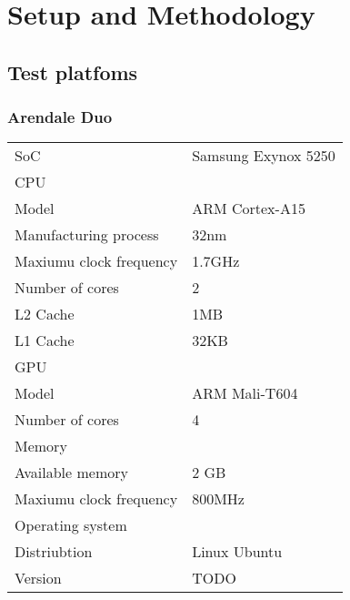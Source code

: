 \chapter[Setup and Methodology]{Setup and Methodology}

\section{Test platfoms}

\subsection{Arendale Duo}
\begin{table}[h]
  \begin{tabular}{ll}
    SoC & Samsung Exynox 5250 \\
    CPU &  \\
    Model & ARM Cortex-A15 \\
    Manufacturing process & 32nm \\
    Maxiumu clock frequency & 1.7GHz \\
    Number of cores & 2 \\
    L2 Cache & 1MB \\
    L1 Cache & 32KB \\
    GPU &  \\
    Model & ARM Mali-T604 \\
    Number of cores & 4 \\
    Memory &  \\
    Available memory & 2 GB \\
    Maxiumu clock frequency & 800MHz \\
    Operating system &  \\
    Distriubtion & Linux Ubuntu \\
    Version & TODO
  \end{tabular}
\end{table}

